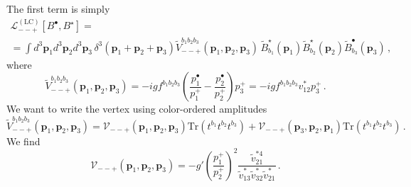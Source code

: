 \documentclass[english,american]{article}
\begin{document}
The first term is simply
\begin{multline*}
\mathcal{L}_{--+}^{\left(\mathrm{LC}\right)}\left[B^{\bullet},B^{\star}\right]=\\
=\int d^{3}\mathbf{p}_{1}d^{3}\mathbf{p}_{2}d^{3}\mathbf{p}_{3}\,\delta^{3}\left(\mathbf{p}_{1}+\mathbf{p}_{2}+\mathbf{p}_{3}\right)\tilde{V}_{--+}^{b_{1}b_{2}b_{3}}\left(\mathbf{p}_{1},\mathbf{p}_{2},\mathbf{p}_{3}\right)\,\tilde{B}_{b_{1}}^{\star}\left(\mathbf{p}_{1}\right)\tilde{B}_{b_{2}}^{\star}\left(\mathbf{p}_{2}\right)\tilde{B}_{b_{3}}^{\bullet}\left(\mathbf{p}_{3}\right)\,,
\end{multline*}
where
\begin{equation}
\tilde{V}_{--+}^{b_{1}b_{2}b_{3}}\left(\mathbf{p}_{1},\mathbf{p}_{2},\mathbf{p}_{3}\right)=-igf^{b_{1}b_{2}b_{3}}\left(\frac{p_{1}^{\bullet}}{p_{1}^{+}}-\frac{p_{2}^{\bullet}}{p_{2}^{+}}\right)p_{3}^{+}=-igf^{b_{1}b_{2}b_{3}}v_{12}^{*}p_{3}^{+}\,.
\end{equation}
We want to write the vertex using color-ordered amplitudes
\begin{equation}
\tilde{V}_{--+}^{b_{1}b_{2}b_{3}}\left(\mathbf{p}_{1},\mathbf{p}_{2},\mathbf{p}_{3}\right)=\mathcal{V}_{--+}\left(\mathbf{p}_{1},\mathbf{p}_{2},\mathbf{p}_{3}\right)\mathrm{Tr}\left(t^{b_{1}}t^{b_{2}}t^{b_{3}}\right)+\mathcal{V}_{--+}\left(\mathbf{p}_{3},\mathbf{p}_{2},\mathbf{p}_{1}\right)\mathrm{Tr}\left(t^{b_{1}}t^{b_{2}}t^{b_{3}}\right)\,.
\end{equation}
We find
\begin{equation}
\mathcal{V}_{--+}\left(\mathbf{p}_{1},\mathbf{p}_{2},\mathbf{p}_{3}\right)=-g'\left(\frac{p_{1}^{+}}{p_{2}^{+}}\right)^{2}\frac{\tilde{v}_{21}^{*4}}{\tilde{v}_{13}^{*}\tilde{v}_{32}^{*}\tilde{v}_{21}^{*}}\,.
\end{equation}
\end{document}

